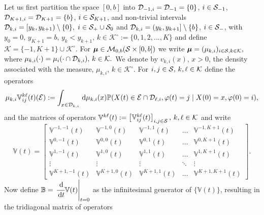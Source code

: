 Let us first partition the space \([0,b]\) into \(\mathcal{D}_{-1,i}=\mathcal{D}_{-1} = \{0\}\), \(i\in\mathcal{S}_{-1}\), \(\mathcal{D}_{{K+1},i}=\mathcal{D}_{{K+1}}=\{b\}\), \(i\in\mathcal{S}_{K+1}\), and non-trivial intervals \(\mathcal{D}_{k,i}=[y_k,y_{k+1})\setminus \{0\},\) \(i\in\mathcal{S}_+\cup\mathcal{S}_0\) and \(\mathcal{D}_{k,i}=(y_k,y_{k+1}]\setminus \{b\}\), \(i\in\mathcal{S}_-\), with \(y_0=0,\,y_{K+1}=b,\, y_k<y_{k+1},\,k\in\mathcal K^\circ:=\{0,1,2,...,K\}\) and define \(\mathcal K = \{-1,K+1\}\cup\mathcal K^\circ\). For $\boldsymbol{\mu} \in \mathcal{M}_{0,b}(\mathcal{S} \times [0,b])$ we write \(\boldsymbol{\mu} = (\mu_{k,i})_{i \in \mathcal{S},k\in\mathcal K},\) where $\mu_{k,i}(\cdot) = \mu_i(\cdot \cap \mathcal{D}_{k,i}),\,k\in\mathcal K.$ We denote by \(v_{k,i}(x),\,x>0\), the density associated with the measure, \(\mu_{k,i},\,k\in \mathcal K^\circ\). For \( i,j\in\mathcal{S},\,k,\ell\in\mathcal K\) define the operators 
\[\mu_{k,i} \mathbb V_{ij}^{k \ell}(t)(\mathcal{E}) := \int_{x\in\mathcal{D}_{k,i}} \, \mathrm{d} \mu_{k,i}(x)\mathbb P (X(t) \in\mathcal{E}\cap \mathcal{D}_{\ell,i},\varphi(t) = j \mid X(0) = x, \varphi(0) = i),\]
and the matrices of operators \(\mathbb V^{k\ell}(t) := \begin{bmatrix} \mathbb V_{ij}^{k\ell}(t) \end{bmatrix}_{i,j\in\mathcal S},\,k,\ell\in\mathcal K\) and write 
\[\mathbb V(t) = \left[
	\begin{array}{ccccc}
		\mathbb V^{{-1},{-1}}(t)&\mathbb V^{{-1},0}(t)& \mathbb V^{{-1},1}(t) &\hdots & \mathbb V^{{-1},{K+1}}(t)\\
		\mathbb V^{0,{-1}}(t)&\mathbb V^{0,0}(t)&\mathbb V^{0,1}(t)&\hdots&\mathbb V^{0,{K+1}}(t)\\
		\mathbb V^{1,{-1}}(t)&\mathbb V^{1,0}(t)&\mathbb V^{1,1}(t)&\hdots&\mathbb V^{1,{K+1}}(t)\\
		\vdots & \vdots & \vdots & \ddots & \vdots \\
		\mathbb V^{{K+1},{-1}}(t) &\mathbb V^{{K+1},0}(t) &\mathbb V^{{K+1},1}(t) & \hdots & \mathbb V^{{K+1},{K+1}}(t) 
	\end{array}\right].\]
Now define \(\mathbb B=\left.\cfrac{\, \mathrm{d}}{\, \mathrm{d} t}\mathbb V(t)\right|_{t=0}\) as the infinitesimal generator of \(\{\mathbb V(t)\}\), resulting in the tridiagonal matrix of operators 
